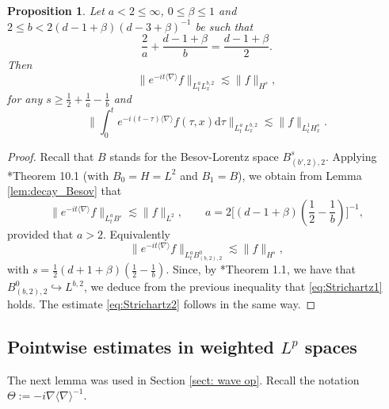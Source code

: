 \documentclass[12pt]{article}
\theoremstyle{plain}
\newtheorem{prop}[theo]{Proposition}
\begin{document}
\begin{prop}\label{prop:Strichartz-Lorentz}
    Let $a<2\le\infty$, $0\le\beta\le1$ and $2\le b< 2(d-1+\beta)(d-3+\beta)^{-1}$ be such that
    \begin{equation*}
		\frac{2}{a} + \frac{d-1+\beta}{b} = \frac{d-1+\beta}{2}.
	\end{equation*}
	Then
	\begin{equation}\label{eq:Strichartz1}
       \|e^{-it\langle\nabla\rangle}f\|_{L^a_tL^{b,2}_x}\lesssim \|f\|_{H^s},
   \end{equation}
   for any $s\ge\frac12+\frac1a-\frac1b$    and
   	\begin{equation}\label{eq:Strichartz2}
		\Big\|\int_{0}^t e^{-i(t-\tau)\langle \nabla\rangle} f(\tau,x) \mathrm{d}\tau \Big\|_{L^a_t\, L^{b,2}_x} \lesssim  \|f\|_{L^{1}_t H^{s}_x}.
	\end{equation}
\end{prop}

\begin{proof}
   Recall that $B$ stands for the Besov-Lorentz space $B_{(b',2),2}^s$.  Applying \cite{KeelTao}*{Theorem 10.1} (with $B_0=H=L^2$ and $B_1=B$), we obtain from Lemma \ref{lem:decay_Besov} that
   \begin{equation*}
       \|e^{-it\langle\nabla\rangle}f\|_{L^a_tB'}\lesssim \|f\|_{L^2}, \qquad a=2\Big[(d-1+\beta)(\frac12-\frac1b)\Big]^{-1},
   \end{equation*}
   provided that $a>2$. Equivalently
   \begin{equation*}
       \|e^{-it\langle\nabla\rangle}f\|_{L^a_tB_{(b,2),2}^0}\lesssim \|f\|_{H^s},
   \end{equation*}
   with $s=\frac12(d+1+\beta)(\frac12-\frac1b)$. Since, by \cite{SeegerTrebels}*{Theorem 1.1}, we have that $B^0_{(b,2),2}\hookrightarrow L^{b,2}$, we deduce from the previous inequality that \eqref{eq:Strichartz1} holds. The estimate \eqref{eq:Strichartz2} follows in the same way.
\end{proof}



\subsection{Pointwise estimates in weighted $L^p$ spaces}\label{subsec:pointwiseLp}

The next lemma was used in Section \ref{sect: wave op}. Recall the notation $\Theta:=-i\nabla\langle\nabla\rangle^{-1}$.
\end{document}
